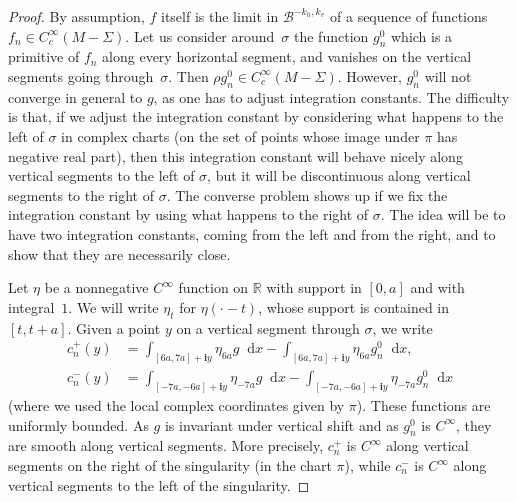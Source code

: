 \documentclass[JEP,XML,SOM,Unicode]{cedram}
\newcommand{\boB}{\mathcal{B}}
\newcommand{\R}{\mathbb{R}}
\newcommand{\dd}{\mathop{}\!\mathrm{d}}
\newcommand{\ic}{\mathbf{i}}
\theoremstyle{definition}
\numberwithin{equation}{section}
\begin{document}
\begin{proof}
By assumption, $f$ itself is the limit in $\boB^{-k_h, k_v}$ of a sequence of
functions $f_n \in C^\infty_c(M-\Sigma)$. Let us consider around~$\sigma$ the
function $g^0_n$ which is a primitive of $f_n$ along every horizontal
segment, and vanishes on the vertical segments going through~$\sigma$. Then
$\rho g^0_n \in C^\infty_c(M-\Sigma)$. However, $g_n^0$ will not converge in
general to $g$, as one has to adjust integration constants. The difficulty is
that, if we adjust the integration constant by considering what happens to
the left of $\sigma$ in complex charts (\ie on the set of points whose
image under $\pi$ has negative real part), then this integration constant
will behave nicely along vertical segments to the left of $\sigma$, but it
will be discontinuous along vertical segments to the right of $\sigma$. The
converse problem shows up if we fix the integration constant by using what
happens to the right of $\sigma$. The idea will be to have two integration
constants, coming from the left and from the right, and to show that they are
necessarily close.

Let $\eta$ be a nonnegative $C^\infty$ function on $\R$ with support in
$[0,a]$ and with integral~$1$. We will write $\eta_t$ for $\eta(\cdot -t)$,
whose support is contained in $[t, t+a]$. Given a point $y$ on a vertical
segment through $\sigma$, we write
\begin{align*}
c_n^+(y) & = \int_{[6a, 7a] + \ic y} \eta_{6a} g \dd x
- \int_{[6a, 7a] + \ic y} \eta_{6a} g^0_n \dd x,
\\
c_n^-(y) & = \int_{[-7a, -6a] + \ic y} \eta_{-7a} g \dd x
- \int_{[-7a, -6a] + \ic y} \eta_{-7a} g^0_n \dd x
\end{align*}
(where we used the local complex coordinates given by $\pi$). These functions
are uniformly bounded. As $g$ is invariant under vertical shift and as
$g^0_n$ is $C^\infty$, they are smooth along vertical segments. More
precisely, $c_n^+$ is $C^\infty$ along vertical segments on the right of the
singularity (in the chart $\pi$), while $c_n^-$ is $C^\infty$ along vertical
segments to the left of the singularity.


\end{proof}
\end{document}
